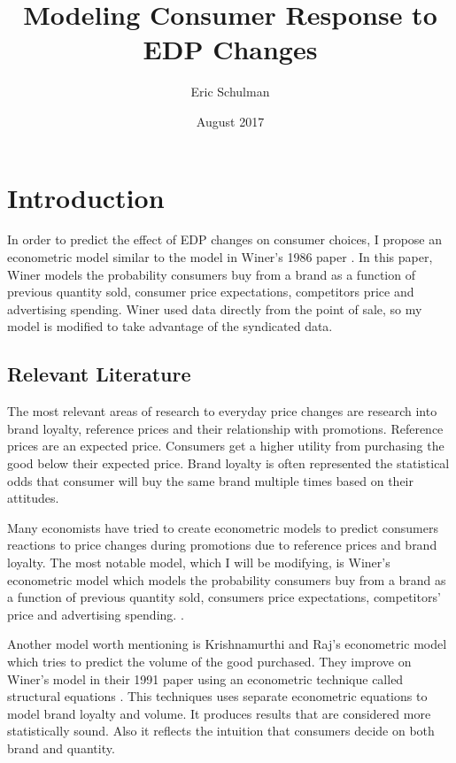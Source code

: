 \documentclass{article}
\title{Modeling Consumer Response to EDP Changes}
\author{Eric Schulman}
\date{August 2017}
\begin{document}
\maketitle

\section{Introduction}

In order to predict the effect of EDP changes on consumer choices, I propose an econometric model similar to the model in Winer's 1986 paper \cite{winer}. In this paper, Winer models the probability consumers buy from a brand as a function of previous quantity sold, consumer price expectations, competitors price and advertising spending. Winer used data directly from the point of sale, so my model is modified to take advantage of the syndicated data.

\subsection{Relevant Literature}

The most relevant areas of research to everyday price changes are research into brand loyalty, reference prices and their relationship with promotions. Reference prices are an expected price. Consumers get a higher utility from purchasing the good below their expected price. Brand loyalty is often represented the statistical odds that consumer will buy the same brand multiple times based on their attitudes. 

Many economists have tried to create econometric models to predict consumers reactions to price changes during promotions due to reference prices and brand loyalty. The most notable model, which I will be modifying, is Winer's econometric model which models the probability consumers buy from a brand as a function of previous quantity sold, consumers price expectations, competitors' price and advertising spending.  \cite{winer}.

Another model worth mentioning is Krishnamurthi and Raj's econometric model which tries to predict the volume of the good purchased. They improve on Winer's model in their 1991 paper using an econometric technique called structural equations \cite{krishnamurthi}. This techniques uses separate econometric equations to model brand loyalty and volume. It produces results that are considered more statistically sound. Also it reflects the intuition that consumers decide on both brand and quantity.
\end{document}
